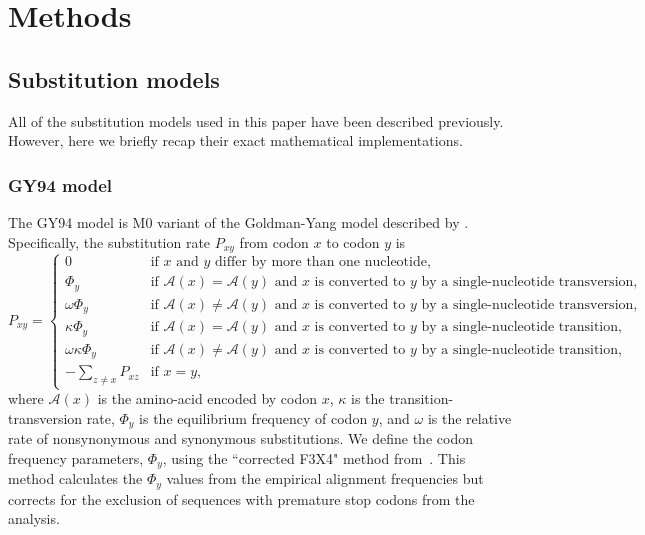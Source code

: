 \documentclass[11pt]{article}
\begin{document}
\section*{Methods}

\subsection*{Substitution models}
All of the substitution models used in this paper have been described previously.
However, here we briefly recap their exact mathematical implementations.

\subsubsection*{GY94 model}

The GY94 model is M0 variant of the Goldman-Yang model described by \citet{yang2000codon}. 
Specifically, the substitution rate $P_{xy}$ from codon $x$ to codon $y$ is 
\begin{equation}
\label{eq:GY94}
P_{xy} = 
\begin{cases}
  0 & \mbox{if $x$ and $y$ differ by more than one nucleotide,}\\
  \Phi_y & \mbox{if $\mathcal{A}\left(x\right) = \mathcal{A}\left(y\right)$ and $x$ is converted to $y$ by a single-nucleotide transversion,} \\
  \omega \Phi_{y} & \mbox{if $\mathcal{A}\left(x\right) \ne \mathcal{A}\left(y\right)$ and $x$ is converted to $y$ by a single-nucleotide transversion,} \\
  \kappa \Phi_y & \mbox{if $\mathcal{A}\left(x\right) = \mathcal{A}\left(y\right)$ and $x$ is converted to $y$ by a single-nucleotide transition,} \\
  \omega \kappa \Phi_{y} & \mbox{if $\mathcal{A}\left(x\right) \ne \mathcal{A}\left(y\right)$ and $x$ is converted to $y$ by a single-nucleotide transition,} \\
  -\sum\limits_{z \ne x} P_{xz} & \mbox{if $x = y$,}
  \end{cases}
\end{equation}
where $\mathcal{A}\left(x\right)$ is the amino-acid encoded by codon $x$, $\kappa$ is the transition-transversion rate, $\Phi_y$ is the equilibrium frequency of codon $y$, and $\omega$ is the relative rate of nonsynonymous and synonymous substitutions.
We define the codon frequency parameters, $\Phi_y$, using the ``corrected F3X4" method from~\citep{pond2010correcting}. 
This method calculates the $\Phi_y$ values from the empirical alignment frequencies but corrects for the exclusion of sequences with premature stop codons from the analysis. 
\end{document}
